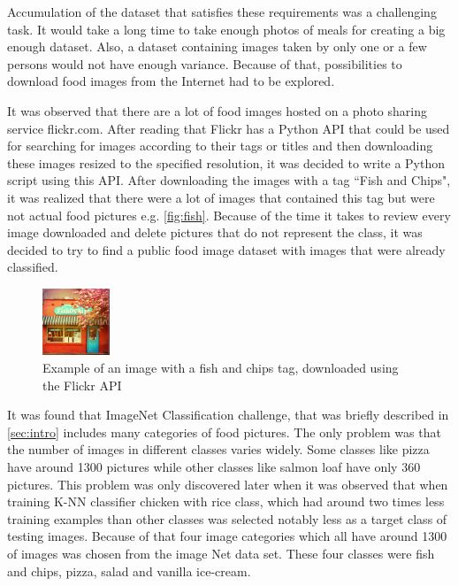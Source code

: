 Accumulation of the dataset that satisfies these requirements was a challenging task. It would take a long time to take enough photos of meals for creating a big enough dataset. Also, a dataset containing images taken by only one or a few persons would not have enough variance. Because of that, possibilities to download food images from the Internet had to be explored.


It was observed that there are a lot of food images hosted on a photo sharing service flickr.com. After reading that Flickr has a Python API that could be used for searching for images according to their tags or titles and then downloading these images resized to the specified resolution, it was decided to write a Python script using this API. After downloading the images with a tag ``Fish and Chips",  it was realized that there were a lot of images that contained this tag but were not actual food pictures e.g. \autoref{fig:fish}. Because of the time it takes to review every image downloaded and delete pictures that do not represent the class, it was decided to try to find a public food image dataset with images that were already classified.  


\begin{figure}[ht]
\centering
\includegraphics[width=2cm]{Figures/c3/flick.jpg}
\caption{Example of an image with a fish and chips tag, downloaded using the Flickr API}
\label{fig:fish}
\end{figure}


It was found that ImageNet Classification challenge, that was briefly described in \autoref{sec:intro}  includes many categories of food pictures. The only problem was that the number of images in different classes varies widely. Some classes like pizza have around 1300 pictures while other classes like salmon loaf have only 360 pictures. This problem was only discovered later when it was observed that when training K-NN classifier chicken with rice class, which had around two times less training examples than other classes was selected notably less as a target class of testing images. Because of that four image categories which all have around 1300 of images was chosen from the image Net data set. These four classes were fish and chips, pizza, salad and vanilla ice-cream. 

